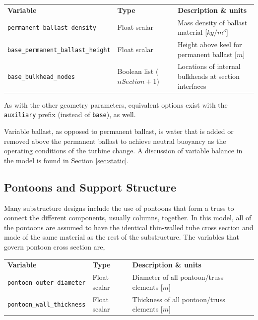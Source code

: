 {\footnotesize
  \begin{tabularx}{\linewidth}{ l l X }
    \textbf{Variable} & \textbf{Type} & \textbf{Description \& units} \\
    \texttt{permanent\_ballast\_density} & Float scalar & Mass density of ballast material [$kg/m^3$]\\
    \texttt{base\_permanent\_ballast\_height} & Float scalar & Height above keel for permanent ballast [$m$]\\
    \texttt{base\_bulkhead\_nodes} & Boolean list ($nSection+1$) & Locations of internal bulkheads at section interfaces\\
  \end{tabularx}
}
As with the other geometry parameters, equivalent options exist with the
\texttt{auxiliary} prefix (instead of \texttt{base}), as well.

Variable ballast, as opposed to permanent ballast, is water that is
added or removed above the permanent ballast to achieve neutral buoyancy as the
operating conditions of the turbine change.  A discussion of variable
balance in the model is found in Section \ref{sec:static}.

\subsection{Pontoons and Support Structure}
Many substructure designs include the use of pontoons that form a truss
to connect the different components, usually columns, together.  In this
model, all of the pontoons are assumed to have the identical thin-walled
tube cross section and made of the same material as the rest of the
substructure.  The variables that govern pontoon cross section are,

{\footnotesize
  \begin{tabularx}{\linewidth}{ l l X }
    \textbf{Variable} & \textbf{Type} & \textbf{Description \& units} \\
    \texttt{pontoon\_outer\_diameter} & Float scalar & Diameter of all pontoon/truss elements [$m$]\\
    \texttt{pontoon\_wall\_thickness} & Float scalar & Thickness of all pontoon/truss elements [$m$]\\
  \end{tabularx}
}


